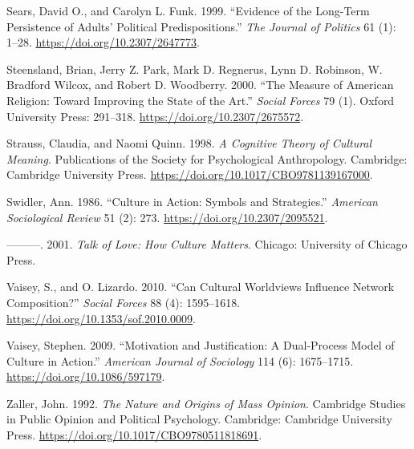 \documentclass[12pt,]{article}
\begin{document}
\leavevmode\hypertarget{ref-sears1999}{}%
Sears, David O., and Carolyn L. Funk. 1999. ``Evidence of the Long-Term Persistence of Adults' Political Predispositions.'' \emph{The Journal of Politics} 61 (1): 1--28. \url{https://doi.org/10.2307/2647773}.

\leavevmode\hypertarget{ref-steensland2000}{}%
Steensland, Brian, Jerry Z. Park, Mark D. Regnerus, Lynn D. Robinson, W. Bradford Wilcox, and Robert D. Woodberry. 2000. ``The Measure of American Religion: Toward Improving the State of the Art.'' \emph{Social Forces} 79 (1). Oxford University Press: 291--318. \url{https://doi.org/10.2307/2675572}.

\leavevmode\hypertarget{ref-strauss1998}{}%
Strauss, Claudia, and Naomi Quinn. 1998. \emph{A Cognitive Theory of Cultural Meaning}. Publications of the Society for Psychological Anthropology. Cambridge: Cambridge University Press. \url{https://doi.org/10.1017/CBO9781139167000}.

\leavevmode\hypertarget{ref-swidler1986}{}%
Swidler, Ann. 1986. ``Culture in Action: Symbols and Strategies.'' \emph{American Sociological Review} 51 (2): 273. \url{https://doi.org/10.2307/2095521}.

\leavevmode\hypertarget{ref-swidler2001}{}%
---------. 2001. \emph{Talk of Love: How Culture Matters}. Chicago: University of Chicago Press.

\leavevmode\hypertarget{ref-vaisey2010}{}%
Vaisey, S., and O. Lizardo. 2010. ``Can Cultural Worldviews Influence Network Composition?'' \emph{Social Forces} 88 (4): 1595--1618. \url{https://doi.org/10.1353/sof.2010.0009}.

\leavevmode\hypertarget{ref-vaisey2009}{}%
Vaisey, Stephen. 2009. ``Motivation and Justification: A Dual‐Process Model of Culture in Action.'' \emph{American Journal of Sociology} 114 (6): 1675--1715. \url{https://doi.org/10.1086/597179}.

\leavevmode\hypertarget{ref-zaller1992}{}%
Zaller, John. 1992. \emph{The Nature and Origins of Mass Opinion}. Cambridge Studies in Public Opinion and Political Psychology. Cambridge: Cambridge University Press. \url{https://doi.org/10.1017/CBO9780511818691}.
\end{document}

